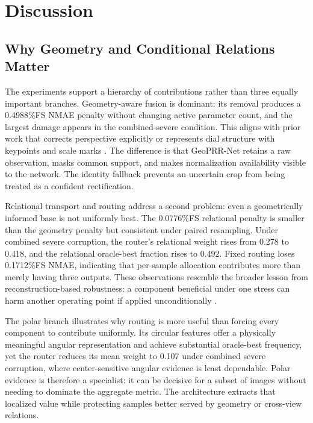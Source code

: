\documentclass[electronics,article,submit,oneauthor]{Definitions/mdpi}
\newcommand{\modelname}{GeoPRR-Net\xspace}
\begin{document}
\section{Discussion}
\label{sec:discussion}

\subsection{Why Geometry and Conditional Relations Matter}

The experiments support a hierarchy of contributions rather than three equally important branches. Geometry-aware fusion is dominant: its removal produces a 0.4988\%FS NMAE penalty without changing active parameter count, and the largest damage appears in the combined-severe condition. This aligns with prior work that corrects perspective explicitly or represents dial structure with keypoints and scale marks \cite{bao2019ipm,wang2022scalemark,tan2024transunet,lee2026p2yolo}. The difference is that \modelname retains a raw observation, masks common support, and makes normalization availability visible to the network. The identity fallback prevents an uncertain crop from being treated as a confident rectification.

Relational transport and routing address a second problem: even a geometrically informed base is not uniformly best. The 0.0776\%FS relational penalty is smaller than the geometry penalty but consistent under paired resampling. Under combined severe corruption, the router's relational weight rises from 0.278 to 0.418, and the relational oracle-best fraction rises to 0.492. Fixed routing loses 0.1712\%FS NMAE, indicating that per-sample allocation contributes more than merely having three outputs. These observations resemble the broader lesson from reconstruction-based robustness: a component beneficial under one stress can harm another operating point if applied unconditionally \cite{ninama2026grnet}.

The polar branch illustrates why routing is more useful than forcing every component to contribute uniformly. Its circular features offer a physically meaningful angular representation and achieve substantial oracle-best frequency, yet the router reduces its mean weight to 0.107 under combined severe corruption, where center-sensitive angular evidence is least dependable. Polar evidence is therefore a specialist: it can be decisive for a subset of images without needing to dominate the aggregate metric. The architecture extracts that localized value while protecting samples better served by geometry or cross-view relations.
\end{document}
